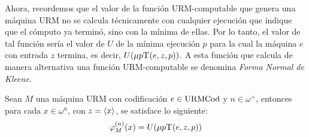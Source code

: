 Ahora, recordemos que el valor de la función URM-computable que genera una máquina URM no se calcula técnicamente con cualquier ejecución que indique que el cómputo ya terminó, sino con la mínima de ellas. Por lo tanto, el valor de tal función sería el valor de $U$ de la mínima ejecución $p$ para la cual la máquina $e$ con entrada $z$ termina, es decir, $U\pa*{\mu p \KLEENE\pa*{e, z, p}}$. A esta función que calcula de manera alternativa una función URM-computable se denomina \emph{Forma Normal de Kleene}.

\begin{theorem}
	\label{theo: forma_normal_kleene} %
	Sean $M$ una máquina URM con codificación $e\in\URMCODIGO$ y $n\in\omega^{+}$, entonces para cada $x\in\omega^{n}$, con $z =\inner*{x}$, se satisface lo siguiente:
	\[
		\PHI{M}[n]\pa*{x} = U\pa*{\mu p \KLEENE\pa*{e, z, p}}
	\]
\end{theorem}

